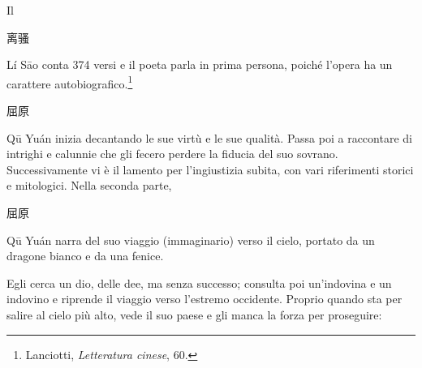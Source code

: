 \documentclass[12pt,titlepage]{article}
\begin{document}
Il 
\begin{CJK*}{UTF8}{gbsn}离骚\end{CJK*}
 Lí Sāo conta 374 versi e il poeta parla in prima persona, poiché l'opera ha un carattere autobiografico.\footnote{Lanciotti, \emph{Letteratura cinese}, 60.}
 
\begin{CJK*}{UTF8}{gbsn}屈原 \end{CJK*}
Qū Yuán inizia decantando le sue virtù e le sue qualità. Passa poi a raccontare di intrighi e calunnie che gli fecero perdere la fiducia del suo sovrano. Successivamente vi è il lamento per l'ingiustizia subita, con vari riferimenti storici e mitologici. Nella seconda parte,
 \begin{CJK*}{UTF8}{gbsn}屈原\end{CJK*}
  Qū Yuán narra del suo viaggio (immaginario) verso il cielo, portato da un dragone bianco e da una fenice. 
  
  Egli cerca un dio, delle dee, ma senza successo; consulta poi un'indovina e un indovino e riprende il viaggio verso l'estremo occidente. Proprio quando sta per salire al cielo più alto, vede il suo paese e gli manca la forza per proseguire:
  
\end{document}
